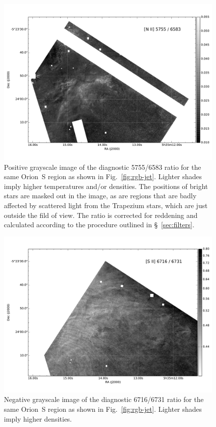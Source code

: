 \documentclass[preprint]{aastex}
\begin{document}
\begin{figure}
  \centering
  \includegraphics[width=\linewidth]{jet_region_niiratio}
  \caption{Positive grayscale image of the diagnostic \nii{} 5755/6583
    ratio for the same Orion~S region as shown in
    Fig.~\ref{fig:rgb-jet}.  Lighter shades imply higher temperatures
    and/or densities.  The positions of bright stars are masked out in
    the image, as are regions that are badly affected by scattered
    light from the Trapezium stars, which are just outside the fild of
    view.  The ratio is corrected for reddening and calculated
    according to the procedure outlined in \S~\ref{sec:filters}.}
  \label{fig:nii-jet}
\end{figure}

\begin{figure}
  \centering
  \includegraphics[width=\linewidth]{jet_region_siiratio}
  \caption{Negative grayscale image of the diagnostic \sii{} 6716/6731
    ratio for the same Orion~S region as shown in
    Fig.~\ref{fig:rgb-jet}.  Lighter shades imply higher
    densities.}
  \label{fig:sii-jet}
\end{figure}
\end{document}

